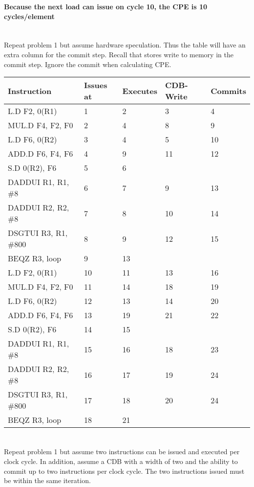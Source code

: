 \documentclass{article}
\begin{document}
\vspace{5mm} 
\textbf{Because the next load can issue on cycle 10, the CPE is 10 cycles/element} 

\section{}
Repeat problem 1 but assume hardware speculation.  Thus the table will have an extra column for the commit step.  Recall that stores write to memory in the commit step.  Ignore the commit when calculating CPE.

\vspace{5mm}
\begin{tabular}{|l|p{2cm}|p{2cm}|p{2cm}|l|}
\hline 
\textbf{Instruction} & \textbf{Issues at} & \textbf{Executes} & \textbf{CDB-Write} & \textbf{Commits} \\
\hline
L.D F2, 0(R1) & 1 & 2 & 3 & 4 \\
MUL.D F4, F2, F0 & 2 & 4 & 8 & 9 \\
L.D F6, 0(R2) & 3 & 4 & 5 & 10 \\
ADD.D F6, F4, F6 & 4 & 9 & 11 & 12 \\ 
S.D 0(R2), F6 & 5 & 6 & & \\
DADDUI R1, R1, \#8 & 6 & 7 & 9& 13 \\
DADDUI R2, R2, \#8 & 7 & 8 & 10 & 14 \\ 
DSGTUI R3, R1, \#800 & 8 & 9 & 12 & 15 \\
\hline
BEQZ R3, loop & 9 & 13 & & \\
\hline
L.D F2, 0(R1) & 10 & 11 & 13 & 16 \\
MUL.D F4, F2, F0 & 11 & 14 & 18 &  19\\
L.D F6, 0(R2) & 12 & 13 & 14 & 20\\
ADD.D F6, F4, F6 & 13 & 19 & 21 & 22\\ 
S.D 0(R2), F6 & 14 & 15 & & \\
DADDUI R1, R1, \#8 & 15 & 16 & 18& 23 \\
DADDUI R2, R2, \#8 & 16 & 17 & 19  &  24 \\ 
DSGTUI R3, R1, \#800 & 17 & 18 & 20 &  24 \\
\hline
BEQZ R3, loop & 18 & 21 & & \\
\hline
\end{tabular}


\section{} Repeat problem 1 but assume two instructions can be issued and executed per clock cycle.  In addition, assume a CDB with a width of two and the ability to commit up to two instructions per clock cycle. The two instructions issued must be within the same iteration.
\end{document}
